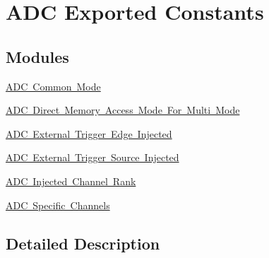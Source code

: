 \hypertarget{group___a_d_c_ex___exported___constants}{}\section{A\+DC Exported Constants}
\label{group___a_d_c_ex___exported___constants}
\subsection*{Modules}
\begin{DoxyCompactItemize}
\item 
\mbox{\hyperlink{group___a_d_c_ex___common__mode}{A\+D\+C Common Mode}}
\item 
\mbox{\hyperlink{group___a_d_c_ex___direct__memory__access__mode__for__multi__mode}{A\+D\+C Direct Memory Access Mode For Multi Mode}}
\item 
\mbox{\hyperlink{group___a_d_c_ex___external__trigger__edge___injected}{A\+D\+C External Trigger Edge Injected}}
\item 
\mbox{\hyperlink{group___a_d_c_ex___external__trigger___source___injected}{A\+D\+C External Trigger Source Injected}}
\item 
\mbox{\hyperlink{group___a_d_c_ex__injected__rank}{A\+D\+C Injected Channel Rank}}
\item 
\mbox{\hyperlink{group___a_d_c_ex__channels}{A\+D\+C Specific Channels}}
\end{DoxyCompactItemize}


\subsection{Detailed Description}
